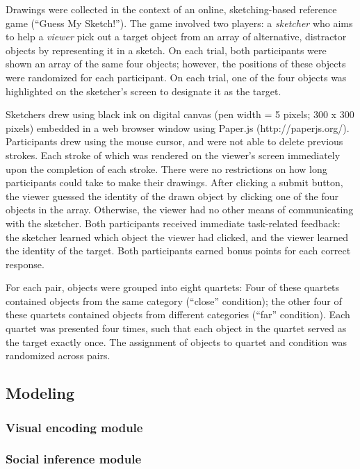 \documentclass[manuscript]{stjour}
\begin{document}
Drawings were collected in the context of an online, sketching-based reference game (``Guess My Sketch!''). The game involved two players: a \textit{sketcher} who aims to help a \textit{viewer} pick out a target object from an array of alternative, distractor objects by representing it in a sketch. On each trial, both participants were shown an array of the same four objects; however, the positions of these objects were randomized for each participant. On each trial, one of the four objects was highlighted on the sketcher's screen to designate it as the target. 

Sketchers drew using black ink on digital canvas (pen width = 5 pixels; 300 x 300 pixels) embedded in a web browser window using Paper.js (http://paperjs.org/). Participants drew using the mouse cursor, and were not able to delete previous strokes. Each stroke of which was rendered on the viewer's screen immediately upon the completion of each stroke. There were no restrictions on how long participants could take to make their drawings. After clicking a submit button, the viewer guessed the identity of the drawn object by clicking one of the four objects in the array. Otherwise, the viewer had no other means of communicating with the sketcher. Both participants received immediate task-related feedback: the sketcher learned which object the viewer had clicked, and the viewer learned the identity of the target. Both participants earned bonus points for each correct response. 

For each pair, objects were grouped into eight quartets: Four of these quartets contained objects from the same category (``close'' condition); the other four of these quartets contained objects from different categories (``far'' condition). Each quartet was presented four times, such that each object in the quartet served as the target exactly once. The assignment of objects to quartet and condition was randomized across pairs. 

\subsection*{Modeling}

\subsubsection*{Visual encoding module}

\subsubsection*{Social inference module}
\end{document}
